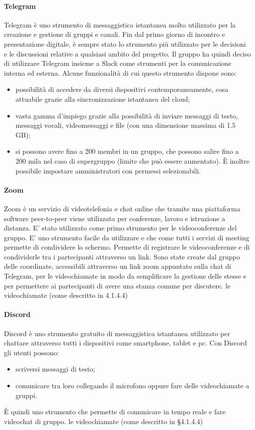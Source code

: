 \paragraph{Telegram}
Telegram è uno strumento di messaggistica istantanea molto utilizzato per la creazione e gestione di gruppi e canali. Fin dal primo giorno di incontro e presentazione digitale, è sempre stato lo strumento più utilizzato per le decisioni e le discussioni relative a qualsiasi ambito del progetto. Il gruppo ha quindi deciso di utilizzare Telegram insieme a Slack come strumenti per la comunicazione interna ed esterna. Alcune funzionalità di cui questo strumento dispone sono:
\begin{itemize}
\item possibilità di accedere da diversi dispositivi contemporaneamente, cosa attuabile
grazie alla sincronizzazione istantanea del cloud;
\item vasta gamma d’impiego grazie alla possibilità di inviare messaggi di testo, messaggi
vocali, videomessaggi e file (con una dimensione massima di 1.5 GB);
\item si possono avere fino a 200 membri in un gruppo, che possono salire fino a 200 mila nel
caso di supergruppo (limite che può essere aumentato). È inoltre possibile impostare
amministratori con permessi selezionabili.
\end{itemize}

\paragraph{Zoom}
Zoom è un servizio di videotelefonia e chat online che tramite una piattaforma software peer-to-peer viene utilizzata per conferenze, lavoro e istruzione a distanza. E' stato utilizzato come primo strumento per le videoconferenze del gruppo. E' uno strumento facile da utilizzare e che come tutti i servizi di meeting permette di condividere lo schermo. Permette di registrare le videoconferenze e di condividerle tra i partecipanti attraverso un link. Sono state create dal gruppo delle coordinate, accessibili attraverso un link zoom appuntato sulla chat di Telegram, per le videochiamate in modo da semplificare la gestione delle stesse e per permettere ai partecipanti di avere una stanza comune per discutere.
le videochiamate (come descritto in 4.1.4.4)

\paragraph{Discord}
Discord è uno strumento gratuito di messaggistica istantanea utilizzato per chattare attraverso tutti i dispositivi come smartphone, tablet e pc. Con Discord gli utenti possono:
\begin{itemize}
\item scriversi messaggi di testo;
\item comunicare tra loro collegando il microfono oppure fare delle videochiamate a gruppi.
\end{itemize}
È quindi uno strumento che permette di comunicare in tempo reale e fare videochat di gruppo. 
le videochiamate (come descritto in §4.1.4.4)

